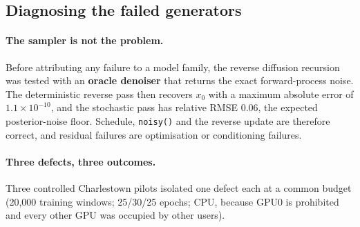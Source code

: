 \subsection{Diagnosing the failed generators}
\label{sec:results-recovery}

\paragraph{The sampler is not the problem.} Before attributing any failure to a
model family, the reverse diffusion recursion was tested with an
\textbf{oracle denoiser} that returns the exact forward-process noise. The
deterministic reverse pass then recovers $x_0$ with a maximum absolute error of
$1.1\times10^{-10}$, and the stochastic pass has relative RMSE 0.06, the expected
posterior-noise floor. Schedule, \texttt{noisy()} and the reverse update are
therefore correct, and residual failures are optimisation or conditioning
failures.

\paragraph{Three defects, three outcomes.} Three controlled Charlestown pilots
isolated one defect each at a common budget (20,000 training windows; 25/30/25
epochs; CPU, because GPU0 is prohibited and every other GPU was occupied by other
users).

